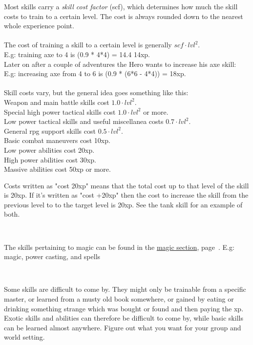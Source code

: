 Most skills carry a \emph{skill cost factor} (scf), which determines how much the skill costs to train to a certain level. The cost is always rounded down to the nearest whole experience point.\\
\\
The cost of training a skill to a certain level is generally $scf \cdot lvl^2$. \\
E.g: training axe to 4 is (0.9 * 4*4) = 14.4 \ca 14xp. \\
Later on after a couple of adventures the Hero wants to increase his axe skill:\\
E.g: increasing axe from 4 to 6 is (0.9 * (6*6 - 4*4)) = 18xp. \\
\\
Skill costs vary, but the general idea goes something like this: \\
Weapon and main battle skills cost $1.0 \cdot lvl^2$. \\
Special high power tactical skills cost $1.0 \cdot lvl^2$ or more. \\
Low power tactical skills and useful miscellanea costs $0.7 \cdot lvl^2$. \\
General rpg support skills cost $0.5 \cdot lvl^2$. \\
Basic combat maneuvers cost 10xp. \\
Low power abilities cost 20xp. \\
High power abilities cost 30xp. \\
Massive abilities cost 50xp or more.

Costs written as "cost 20xp" means that the total cost up to that level of the skill is 20xp. If it's written as "cost +20xp" then the cost to increase the skill from the previous level to to the target level is 20xp. See the tank skill for an example of both.

\

The skills pertaining to magic can be found in the \hyperref[cpt:magic]{magic section}, page~\pageref{cpt:magic}.
E.g: magic, power casting, and spells

\

Some skills are difficult to come by. They might only be trainable from a specific master, or learned from a musty old book somewhere, or gained by eating or drinking something strange which was bought or found and then paying the xp. Exotic skills and abilities can therefore be difficult to come by, while basic skills can be learned almost anywhere. Figure out what you want for your group and world setting.

